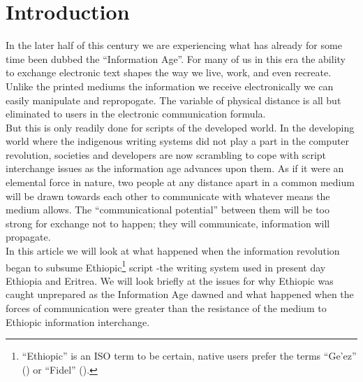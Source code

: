 




\section*{Introduction}
In the later half of this century we are experiencing what has already for
some time been dubbed the ``Information Age''.  For many of us in this era
the ability to exchange electronic text shapes the way we live, work, and
even recreate.  
Unlike the printed mediums the information we receive electronically  we can
easily manipulate and repropogate.  The variable of physical distance is all
but eliminated to users in the electronic communication formula.\\





But this is only readily done for scripts of the developed world.  In the
developing world where the indigenous writing systems did not play a part
in the computer revolution, societies and developers are now scrambling to cope
with script interchange issues as the information age advances upon them.  As
if it were an elemental force in nature, two people at any distance apart in
a common medium will be drawn towards each other to communicate with whatever
means the medium allows.  The ``communicational potential'' between them will be
too strong for exchange not to happen; they will communicate, information will
propagate.\\

In this article we will look at what happened when the information revolution
began to subsume Ethiopic\footnote{``Ethiopic'' is an ISO term to be certain,
native users prefer the terms ``Ge'ez'' ({\smallet {}}) or
``Fidel'' ({\smallet {}}).}
script -the writing system used in present day Ethiopia and Eritrea.  We will
look briefly at the issues for why Ethiopic was caught unprepared as the
Information Age dawned and what happened when the forces of communication were
greater than the resistance of the medium to Ethiopic information interchange.


